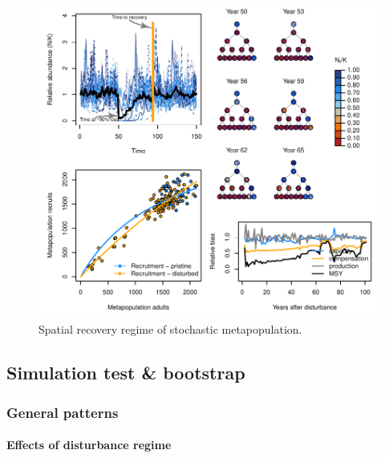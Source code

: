 \documentclass[]{article}
\let\oldparagraph\paragraph
\renewcommand{\paragraph}[1]{\oldparagraph{#1}\mbox{}}
\begin{document}
\begin{figure}[H]

{\centering \includegraphics{Managing_for_ecological_surprises_in_metapopulations_makeHTML_files/figure-latex/example results4-1} 

}

\caption{Spatial recovery regime of stochastic metapopulation.}\label{fig:example results4}
\end{figure}

\hypertarget{simulation-test-bootstrap}{%
\subsection{Simulation test \&
bootstrap}\label{simulation-test-bootstrap}}

\hypertarget{general-patterns}{%
\subsubsection{General patterns}\label{general-patterns}}

\hypertarget{effects-of-disturbance-regime}{%
\paragraph{Effects of disturbance
regime}\label{effects-of-disturbance-regime}}
\end{document}
